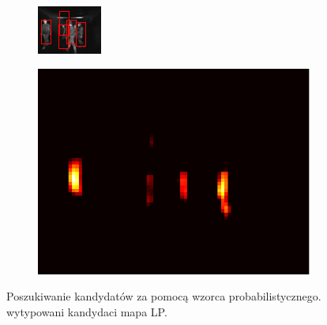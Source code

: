 \begin{figure}[h]
	\centering
	\begin{subfigure}{0.32\textwidth}
		\centering
		\includegraphics[width=0.9\linewidth]{images/sampleTemplateDetection}
		\subcaption{\label{fig:sampleTemplateDetection}}
	\end{subfigure}
	\begin{subfigure}{0.32\textwidth}
		\centering
		\includegraphics[width=0.9\linewidth]{images/sampleLP}
		\subcaption{\label{fig:sampleLP}}
	\end{subfigure}

	\caption[Poszukiwanie kandydatów za pomocą wzorca probabilistycznego.]{Poszukiwanie kandydatów za pomocą wzorca probabilistycznego. \protect{} wytypowani kandydaci \protect{} mapa LP.}
\end{figure}
